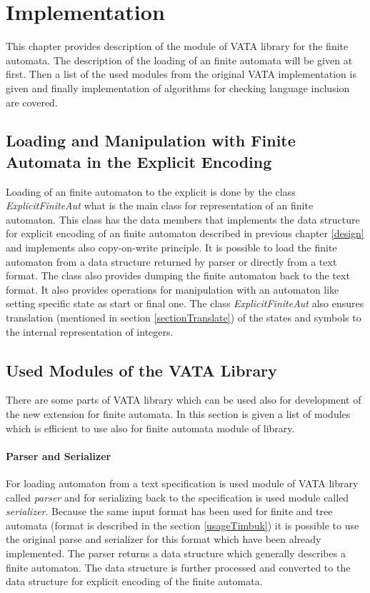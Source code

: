 \chapter{Implementation}
\label{implementation}
This chapter provides description of the module of VATA library for the finite automata. The description of the loading of an finite
automata will be given at first. Then a list of the used modules from the original VATA implementation is given and finally implementation of algorithms
for checking language inclusion are covered.

\section{Loading and Manipulation with Finite Automata in the Explicit Encoding}
Loading of an finite automaton to the explicit is done by  the class \emph{ExplicitFiniteAut} what is the main class for representation of an finite automaton. 
This class has the data members that implements the data structure for explicit encoding of an finite automaton described in previous chapter \ref{design} and
implements also copy-on-write principle. 
It is possible to load the finite automaton from a data structure returned by parser or directly from a text format. The class also provides dumping
the finite automaton back to the text format.
It also provides operations for manipulation with an automaton like setting specific state as start or final one.
The class \emph{ExplicitFiniteAut} also ensures translation (mentioned in section \ref{sectionTranslate}) of the states 
and symbols to the internal representation of integers. 

\section{Used Modules of the VATA Library}
There are some parts of VATA library which can be used also for development of the new extension for finite automata. In this section is given a list of modules
which is efficient to use also for finite automata module of library.

\subsubsection{Parser and Serializer}
For loading automaton from a text specification is used module of VATA library called \emph{parser} and for serializing back to the specification is used
module called \emph{serializer}. Because the same input format has been used for finite and tree automata (format is described in the section \ref{usageTimbuk})
it is possible to use the original parse and serializer for this format which have been already implemented. 
The parser returns a data structure which generally describes a finite automaton. The data structure is further processed and converted 
to the data structure for explicit encoding of the finite automata. 

